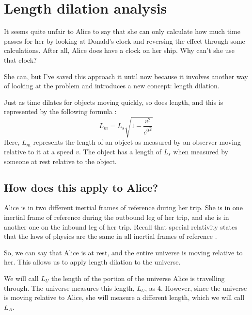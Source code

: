 \section{Length dilation analysis}\label{sec:lengthDilation}
	It seems quite unfair to Alice to say that she can only calculate how much time passes for her by looking at Donald's clock and reversing the effect through some calculations.
	After all, Alice does have a clock on her ship.
	Why can't she use that clock?

	She can, but I've saved this approach it until now because it involves another way of looking at the problem and introduces a new concept: length dilation.

	Just as time dilates for objects moving quickly, so does length, and this is represented by the following formula \autocite[\ppno~588--594]{textbook}:
	\begin{equation}\label{eq:lengthDilation}
		L_m = L_s \sqrt{1 - \frac{v^2}{\si{\clight}^2}}
	\end{equation}
	Here, $L_m$ represents the length of an object as measured by an observer moving relative to it at a speed $v$.
	The object has a length of $L_s$ when measured by someone at rest relative to the object.

	\subsection{How does this apply to Alice?}
		Alice is in two different inertial frames of reference during her trip.
		She is in one inertial frame of reference during the outbound leg of her trip, and she is in another one on the inbound leg of her trip.
		Recall that special relativity states that the laws of physics are the same in all inertial frames of reference \autocite{textbook,einstein1916}.
		
		So, we can say that Alice is at rest, and the entire universe is moving relative to her.
		This allows us to apply length dilation to the universe.

		We will call $L_U$ the length of the portion of the universe Alice is travelling through.
		The universe measures this length, $L_U$, as \SI{4}{\lightyear}.
		However, since the universe is moving relative to Alice, she will measure a different length, which we will call $L_A$.

